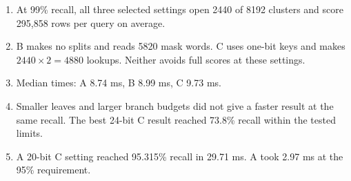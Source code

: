 \begin{enumerate}
\item At 99\% recall, all three selected settings open 2440 of 8192 clusters and score 295,858 rows per query on average.
\item B makes no splits and reads 5820 mask words. C uses one-bit keys and makes $2440\times2=4880$ lookups. Neither avoids full scores at these settings.
\item Median times: A 8.74 ms, B 8.99 ms, C 9.73 ms.
\item Smaller leaves and larger branch budgets did not give a faster result at the same recall. The best 24-bit C result reached 73.8\% recall within the tested limits.
\item A 20-bit C setting reached 95.315\% recall in 29.71 ms. A took 2.97 ms at the 95\% requirement.
\end{enumerate}
